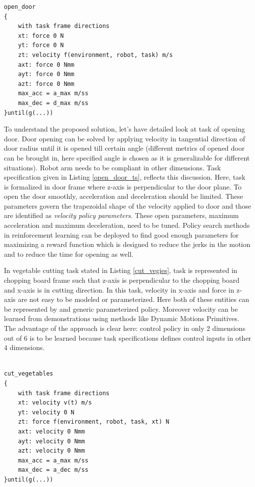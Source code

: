\documentclass[thesis]{mas_proposal}
\begin{document}
\begin{lstlisting}[label=open_door_ts,caption=Task specification for opening door]
open_door
{
	with task frame directions
	xt: force 0 N
	yt: force 0 N
	zt: velocity f(environment, robot, task) m/s
	axt: force 0 Nmm
	ayt: force 0 Nmm
	azt: force 0 Nmm
	max_acc = a_max m/ss
	max_dec = d_max m/ss
}until(g(...))

\end{lstlisting}
To understand the proposed solution, let's have detailed look at task of opening door. Door opening can be solved by applying velocity in tangential direction of door radius until it is opened till certain angle (different metrics of opened door can be brought in, here specified angle is chosen as it is generalizable for different situations). Robot arm needs to be compliant in other dimensions. Task specification given in Listing \ref{open_door_ts}, reflects this discussion. Here, task is formalized in door frame where z-axis is perpendicular to the door plane. To open the door smoothly, acceleration and deceleration should be limited. These parameters govern the trapezoidal shape of the velocity applied to door and those are identified as \textit{velocity policy parameters}. These open parameters, maximum acceleration and maximum deceleration, need to be tuned. Policy search methods in reinforcement learning can be deployed to find good enough parameters for maximizing a reward function which is designed to reduce the jerks in the motion and to reduce the time for opening as well.

In vegetable cutting task stated in Listing \ref{cut_vegies}, task is represented in chopping board frame such that z-axis is perpendicular to the chopping board and x-axis is in cutting direction. In this task, velocity in x-axis and force in z-axis are not easy to be modeled or parameterized. Here both of these entities can be represented by and generic parameterized policy. Moreover velocity can be learned from demonstrations using methods like Dynamic Motions Primitives\cite{lioutikov2016learning}. The advantage of the approach is clear here: control policy in only 2 dimensions out of 6 is to be learned because task specifications defines control inputs in other 4 dimensions. 

\begin{lstlisting}[label=cut_vegies,caption=Task specification for cutting vegetables]

cut_vegetables
{
	with task frame directions
	xt: velocity v(t) m/s
	yt: velocity 0 N
	zt: force f(environment, robot, task, xt) N
	axt: velocity 0 Nmm
	ayt: velocity 0 Nmm
	azt: velocity 0 Nmm
	max_acc = a_max m/ss
	max_dec = a_dec m/ss
}until(g(...))

\end{lstlisting}
\end{document}
